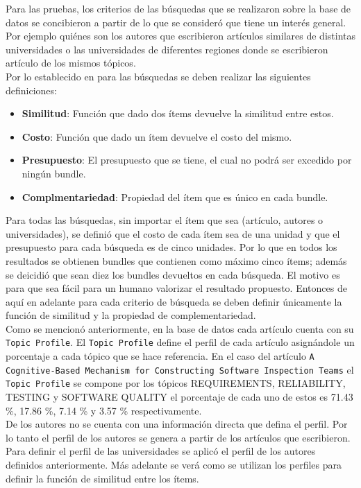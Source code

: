 Para las pruebas, los criterios de las búsquedas que se realizaron sobre la base de datos se concibieron a partir de lo que se consideró que tiene un interés general. Por ejemplo quiénes son los autores que escribieron artículos similares de distintas universidades o las universidades de diferentes regiones donde se escribieron artículo de los mismos tópicos.\\
Por lo establecido en \cite{compositeRetrival} para las búsquedas se deben realizar las siguientes definiciones:
\begin{itemize}
  \item \textbf{Similitud}: Función que dado dos ítems devuelve la similitud entre estos.
  \item \textbf{Costo}: Función que dado un ítem devuelve el costo del mismo.
  \item \textbf{Presupuesto}: El presupuesto que se tiene, el cual no podrá ser excedido por ningún bundle.
  \item \textbf{Complmentariedad}: Propiedad del ítem que es único en cada bundle.
\end{itemize}
Para todas las búsquedas, sin importar el ítem que sea (artículo, autores o universidades),  se definió que el costo de cada ítem sea de una unidad y que el presupuesto para cada búsqueda es de cinco unidades. Por lo que en todos los resultados se obtienen bundles que contienen como máximo cinco ítems; además se deicidió que sean diez los bundles devueltos en cada búsqueda. El motivo es para que sea fácil para un humano valorizar el resultado propuesto. Entonces de aquí en adelante para cada criterio de búsqueda se deben definir únicamente la función de similitud y la propiedad de complementariedad.\\
Como se mencionó anteriormente, en la base de datos cada artículo cuenta con su \texttt{Topic Profile}. El \texttt{Topic Profile} define el perfil de cada artículo asignándole un porcentaje a cada tópico que se hace referencia. En el caso del artículo \texttt{A Cognitive-Based Mechanism for Constructing Software Inspection Teams} el \texttt{Topic Profile} se compone por los tópicos  REQUIREMENTS, RELIABILITY, TESTING y SOFTWARE QUALITY el porcentaje de cada uno de estos es 71.43 \%, 17.86 \%, 7.14 \% y 3.57 \% respectivamente. \\
De los autores no se cuenta con una información directa que defina el perfil. Por lo tanto el perfil de los autores se genera a partir de los artículos que escribieron. Para definir el perfil de las universidades se aplicó el perfil de los autores definidos anteriormente. Más adelante se verá como se utilizan los perfiles para definir la función de similitud entre los ítems.\\
